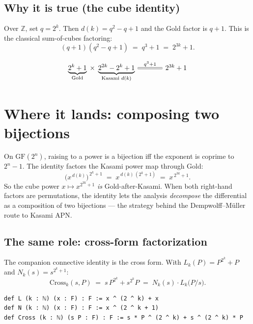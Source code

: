 \documentclass[11pt]{article}
\begin{document}
\bigskip
\subsection*{Why it is true (the cube identity)}

\noindent
Over $\mathbb{Z}$, set $q=2^k$. Then $d(k)=q^2-q+1$ and the Gold factor is $q+1$.
This is the classical sum-of-cubes factoring:
\[
(q+1)(q^2-q+1) \;=\; q^3+1 \;=\; 2^{3k}+1 .
\]

\[
\begin{tikzcd}[column sep=large]
\underbrace{2^k+1}_{\text{Gold}} \;\times\; \underbrace{2^{2k}-2^k+1}_{\text{Kasami } d(k)}
\arrow[r, equal, "{q^3+1}"]
& 2^{3k}+1
\end{tikzcd}
\]


\bigskip

\section{Where it lands: composing two bijections}

\noindent
On $\mathrm{GF}(2^n)$, raising to a power is a bijection iff the exponent is
coprime to $2^n-1$. The identity factors the Kasami power map through Gold:
\[
\bigl(x^{\,d(k)}\bigr)^{\,2^k+1} \;=\; x^{\,d(k)\,(2^k+1)} \;=\; x^{\,2^{3k}+1}.
\]
So the cube power $x\mapsto x^{2^{3k}+1}$ \emph{is} Gold-after-Kasami. When both
right-hand factors are permutations, the identity lets the analysis
\emph{decompose} the differential as a composition of two bijections --- the
strategy behind the Dempwolff--M\"uller route to Kasami APN.

\bigskip
\subsection*{The same role: cross-form factorization}

\noindent
The companion connective identity is the cross form. With
$L_k(P)=P^{2^k}+P$ and $N_k(s)=s^{2^k+1}$:
\[
\mathrm{Cross}_k(s,P)\;=\;s\,P^{2^k}+s^{2^k}P
\;=\; N_k(s)\cdot L_k\!\bigl(P/s\bigr).
\]

\begin{lstlisting}
def L (k : ℕ) (x : F) : F := x ^ (2 ^ k) + x
def N (k : ℕ) (x : F) : F := x ^ (2 ^ k + 1)
def Cross (k : ℕ) (s P : F) : F := s * P ^ (2 ^ k) + s ^ (2 ^ k) * P
\end{lstlisting}
\end{document}
